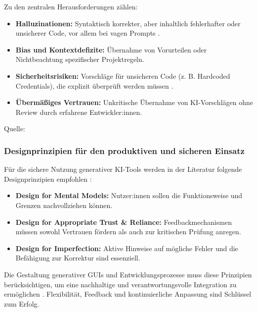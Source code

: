 Zu den zentralen Herausforderungen zählen:
\begin{itemize}
    \item \textbf{Halluzinationen:} Syntaktisch korrekter, aber inhaltlich fehlerhafter oder unsicherer Code, vor allem bei vagen Prompts .
    \item \textbf{Bias und Kontextdefizite:} Übernahme von Vorurteilen oder Nichtbeachtung spezifischer Projektregeln.
    \item \textbf{Sicherheitsrisiken:} Vorschläge für unsicheren Code (z. B. Hardcoded Credentials), die explizit überprüft werden müssen .
    \item \textbf{Übermäßiges Vertrauen:} Unkritische Übernahme von KI-Vorschlägen ohne Review durch erfahrene Entwickler:innen.
\end{itemize}
Quelle: \cite{shi_ai-assisted_2023, weisz_design_2024}

\subsubsection{Designprinzipien für den produktiven und sicheren Einsatz}

Für die sichere Nutzung generativer KI-Tools werden in der Literatur folgende
Designprinzipien empfohlen \cite{weisz_design_2024}:
\begin{itemize}
    \item \textbf{Design for Mental Models:} Nutzer:innen sollen die Funktionsweise und Grenzen nachvollziehen können.
    \item \textbf{Design for Appropriate Trust \& Reliance:} Feedbackmechanismen müssen sowohl Vertrauen fördern als auch zur kritischen Prüfung anregen.
    \item \textbf{Design for Imperfection:} Aktive Hinweise auf mögliche Fehler und die Befähigung zur Korrektur sind essenziell.
\end{itemize}

Die Gestaltung generativer GUIs und Entwicklungsprozesse muss diese Prinzipien
berücksichtigen, um eine nachhaltige und verantwortungsvolle Integration zu
ermöglichen \cite{lee_towards_2025, chen_genui_2025, gill_agile_2025}.
Flexibilität, Feedback und kontinuierliche Anpassung sind Schlüssel zum Erfolg.


